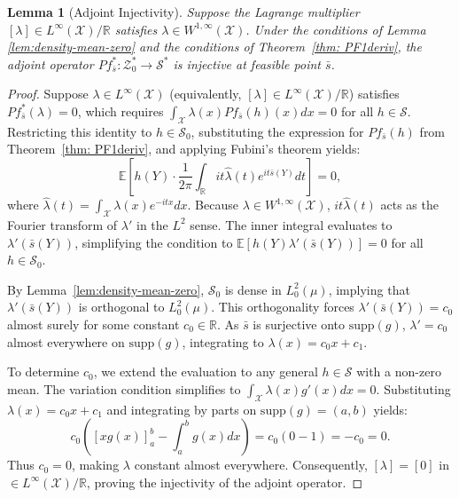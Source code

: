 \documentclass[12pt,leqno]{amsart}
\newtheorem{lemma}{Lemma}
\begin{document}
\begin{lemma}[Adjoint Injectivity]\label{lem:adjoint-injectivity}
Suppose the Lagrange multiplier $[\lambda] \in L^\infty(\mathcal{X})/\mathbb{R}$ satisfies $\lambda \in W^{1,\infty}(\mathcal{X})$. Under the conditions of Lemma \ref{lem:density-mean-zero} and the conditions of Theorem~\ref{thm: PF1deriv}, the adjoint operator $Pf_{\bar{s}}^* : \mathcal{Z}_0^* \to \mathcal{S}^*$ is injective at feasible point $\bar{s}$. 
\end{lemma}
\begin{proof}
Suppose $\lambda\in L^\infty(\mathcal{X})$ (equivalently, $[\lambda] \in L^\infty(\mathcal{X})/\mathbb{R}$) satisfies $Pf_{\bar{s}}^*(\lambda) = 0$, which requires $\int_{\mathcal{X}} \lambda(x) Pf_{\bar{s}}(h)(x)dx = 0$ for all $h \in \mathcal{S}$. Restricting this identity to $h \in \mathcal{S}_0$, substituting the expression for $Pf_{\bar{s}}(h)$ from Theorem~\ref{thm: PF1deriv}, and applying Fubini's theorem yields:
\[
\mathbb{E}\left[h(Y) \cdot \frac{1}{2\pi} \int_{\mathbb{R}} it \hat{\lambda}(t) e^{it\bar{s}(Y)}dt \right] = 0,
\]
where $\hat{\lambda}(t) = \int_{\mathcal{X}} \lambda(x)e^{-itx}dx$. Because $\lambda \in W^{1,\infty}(\mathcal{X})$, $it\hat{\lambda}(t)$ acts as the Fourier transform of $\lambda'$ in the $L^2$ sense. The inner integral evaluates to $\lambda'(\bar{s}(Y))$, simplifying the condition to $\mathbb{E}[h(Y)\lambda'(\bar{s}(Y))] = 0$ for all $h \in \mathcal{S}_0$. 

By Lemma~\ref{lem:density-mean-zero}, $\mathcal{S}_0$ is dense in $L^2_0(\mu)$, implying that $\lambda'(\bar{s}(Y))$ is orthogonal to $L^2_0(\mu)$. This orthogonality forces $\lambda'(\bar{s}(Y)) = c_0$ almost surely for some constant $c_0 \in \mathbb{R}$. As $\bar{s}$ is surjective onto $\mathrm{supp}(g)$, $\lambda' = c_0$ almost everywhere on $\mathrm{supp}(g)$, integrating to $\lambda(x) = c_0 x + c_1$. 

To determine $c_0$, we extend the evaluation to any general $h \in \mathcal{S}$ with a non-zero mean. The variation condition simplifies to $\int_{\mathcal{X}} \lambda(x) g'(x)dx = 0$. Substituting $\lambda(x) = c_0 x + c_1$ and integrating by parts on $\mathrm{supp}(g) = (a,b)$ yields:
\[
c_0 \left( [xg(x)]_a^b - \int_a^b g(x)dx \right) = c_0(0 - 1) = -c_0 = 0.
\]
Thus $c_0 = 0$, making $\lambda$ constant almost everywhere. Consequently, $[\lambda] = [0]$ in $\in L^\infty(\mathcal{X})/\mathbb{R}$, proving the injectivity of the adjoint operator.
\end{proof}
\end{document}
